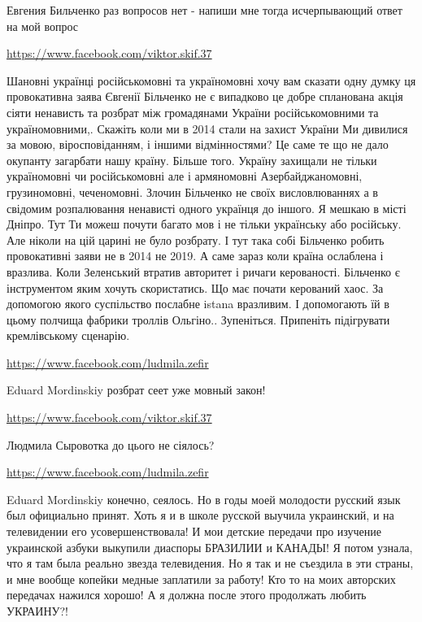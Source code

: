 \documentclass[a4paper,11pt]{extreport}
\begin{document}
\begin{itemize}
\begin{itemize}
Евгения Бильченко раз вопросов нет - напиши мне тогда исчерпывающий ответ на мой вопрос

\end{itemize}
\url{https://www.facebook.com/viktor.skif.37}

Шановні українці російськомовні та україномовні хочу вам сказати одну думку ця провокативна заява Євгенії Більченко не є випадково це добре спланована акція сіяти ненависть та розбрат між громадянами України російськомовними та україномовними,. Скажіть коли ми в 2014 стали на захист України Ми дивилися за мовою, віросповіданням, і іншими відмінностями?
Це саме те що не дало окупанту загарбати нашу країну. Більше того. Україну захищали не тільки україномовні чи російськомовні але і армяномовні Азербайджаномовні, грузиномовні, чеченомовні.
Злочин Більченко не своїх висловлюваннях а в свідомим розпалювання ненависті одного українця до іншого. Я мешкаю в місті Дніпро. Тут Ти можеш почути багато мов і не тільки українську або російську. Але ніколи на цій царині не було розбрату. І тут така собі Більченко робить провокативні заяви не в 2014 не 2019. А саме зараз коли країна ослаблена і вразлива. Коли Зеленський втратив авторитет і ричаги керованості. Більченко є інструментом яким хочуть скористатись. Що має почати керований хаос. За допомогою якого суспільство послабне istana вразливим. І допомогають їй в цьому полчища фабрики троллів Ольгіно.. Зупеніться. Припеніть підігрувати кремлівському сценарію.

\begin{itemize}
\url{https://www.facebook.com/ludmila.zefir}

Eduard Mordinskiy розбрат сеет уже мовный закон!

\url{https://www.facebook.com/viktor.skif.37}

Людмила Сыровотка до цього не сіялось?

\url{https://www.facebook.com/ludmila.zefir}

Eduard Mordinskiy конечно, сеялось. Но в годы моей молодости русский язык был официально принят. Хоть я и в школе русской выучила украинский, и на телевидении его усовершенствовала! И мои детские передачи про изучение украинской азбуки выкупили диаспоры БРАЗИЛИИ и КАНАДЫ! Я потом узнала, что я там была реально звезда телевидения. Но я так и не съездила в эти страны, и мне вообще копейки медные заплатили за работу! Кто то на моих авторских передачах нажился хорошо! А я должна после этого продолжать любить УКРАИНУ?!


\end{itemize}
\end{itemize}
\end{document}
